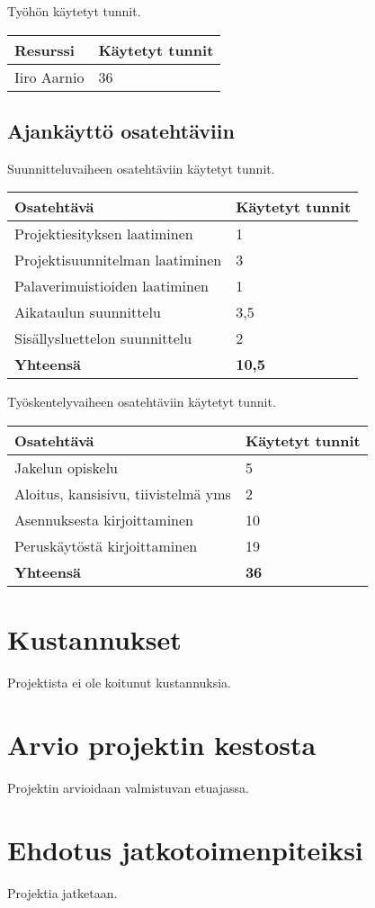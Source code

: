 \documentclass[a4paper, 12pt, finnish]{article}
\begin{document}
Työhön käytetyt tunnit.
\begin{table}[htpb]
\begin{tabular}{|l|l|}
\hline
Resurssi & Käytetyt tunnit \\ \hline
Iiro Aarnio & 36 \\ \hline
\end{tabular}%
\end{table}

\subsection{Ajankäyttö osatehtäviin}

Suunnitteluvaiheen osatehtäviin käytetyt tunnit.
\begin{table}[!htpb]
\begin{tabular}{|l|l|}
\hline
Osatehtävä & Käytetyt tunnit \\ \hline
Projektiesityksen laatiminen & 1 \\ \hline
Projektisuunnitelman laatiminen & 3 \\ \hline
Palaverimuistioiden laatiminen & 1 \\ \hline
Aikataulun suunnittelu & 3,5 \\ \hline
Sisällysluettelon suunnittelu & 2 \\ \hline
    \textbf{Yhteensä} & \textbf{10,5}  \\ \hline
\end{tabular}%
\end{table}

Työskentelyvaiheen osatehtäviin käytetyt tunnit.
\begin{table}[!htpb]
\begin{tabular}{|l|l|}
\hline
Osatehtävä & Käytetyt tunnit \\ \hline
Jakelun opiskelu & 5 \\ \hline
Aloitus, kansisivu, tiivistelmä yms & 2 \\\hline
Asennuksesta kirjoittaminen & 10 \\\hline
Peruskäytöstä kirjoittaminen & 19 \\\hline
    \textbf{Yhteensä} & \textbf{36}  \\ \hline
\end{tabular}%
\end{table}

\section{Kustannukset}

Projektista ei ole koitunut kustannuksia.

\section{Arvio projektin kestosta}

Projektin arvioidaan valmistuvan etuajassa.

\section{Ehdotus jatkotoimenpiteiksi}

Projektia jatketaan.
\end{document}
